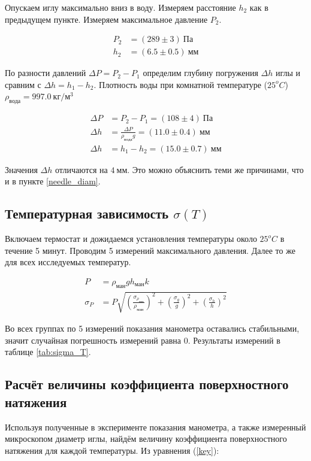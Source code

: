 \documentclass[a4paper, 12pt]{article}
\begin{document}
			Опускаем иглу максимально вниз в воду. Измеряем расстояние $h_2$ как в предыдущем пункте. Измеряем максимальное давление $P_2$.

			\begin{align*}
				P_2 &= (289 \pm 3)~Па\\
				h_2 &= (6.5 \pm 0.5)~мм
			\end{align*}

			По разности давлений $\Delta P = P_2 - P_1$ определим глубину погружения $\Delta h$ иглы и сравним с $\Delta h = h_1 - h_2$. Плотность воды при комнатной температуре ($25^oC$) $\rho_{вода} = 997.0~кг/м^3$

			\begin{align*}
				\Delta P &= P_2 - P_1 = (108 \pm 4)~Па\\
				\Delta h &= \frac{\Delta P}{\rho_{вода} g} = (11.0 \pm 0.4)~мм\\
				\Delta h &= h_1 - h_2 = (15.0 \pm 0.7)~мм
			\end{align*}

			Значения $\Delta h$ отличаются на $4~мм$. Это можно объяснить теми же причинами, что и в пункте \ref{needle_diam}.

		\subsection{Температурная зависимость $\sigma(T)$}

			Включаем термостат и дожидаемся установления температуры около $25^oC$ в течение 5 минут. Проводим 5 измерений максимального давления. Далее то же для всех исследуемых температур.

			\begin{align*}
				P &= \rho_{ман} g h_{ман} k \\
				\sigma_P &= P \sqrt{\left( \frac{\sigma_{\rho_{ман}}}{\rho_{ман}} \right)^2 + \left( \frac{\sigma_g}{g} \right)^2 + \left( \frac{\sigma_h}{h} \right)^2}
			\end{align*}

			Во всех группах по 5 измерений показания манометра оставались стабильными, значит случайная погрешность измерений равна 0. Результаты измерений в таблице \ref{tab:sigma_T}.

		\subsection{Расчёт величины коэффициента поверхностного натяжения}

			Используя полученные в эксперименте показания манометра, а также измеренный микроскопом диаметр иглы, найдём величину коэффициента поверхностного натяжения для каждой температуры. Из уравнения (\ref{key}):
\end{document}
